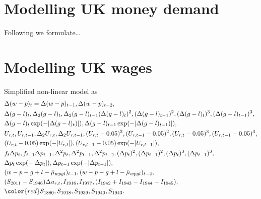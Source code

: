 \section{Modelling UK money demand}
Following \cite{KrolzigHendry-Computer_automation-2001} we formulate\ldots

\section{Modelling UK wages}
Simplified non-linear model as \cite[pp.~120]{Hendry-Introductory-2015}
\begin{align}\nonumber
	&\Delta(w-p)_t = \Delta(w-p)_{t-1}, \Delta(w-p)_{t-2}, \\ \nonumber
	&\Delta(g-l)_t, \Delta_2(g-l)_t, \Delta_2(g-l)_{t-1}
		(\Delta(g-l)_t)^2, (\Delta(g-l)_{t-1})^2, (\Delta(g-l)_t)^3,
		(\Delta(g-l)_{t-1})^3, \\ \nonumber
	&\Delta(g-l)_t\exp(-|\Delta(g-l)_t)|), \Delta(g-l)_{t-1}\exp(-|\Delta(g-l)_{t-1})|), \\ \nonumber
	&U_{r,t}, U_{r,t-1}, \Delta_2U_{r,t}, \Delta_2U_{r,t-1}, (U_{r,t} - 0.05)^2,
		(U_{r,t-1} - 0.05)^2, (U_{r,t} - 0.05)^3, (U_{r,t-1} - 0.05)^3, \\ \nonumber
	&(U_{r,t} - 0.05)\exp(-|U_{r,t}|), (U_{r,t-1} - 0.05)\exp(-|U_{r,t-1}|), \\ \nonumber
	&f_t\Delta p_t, f_{t-1}\Delta p_{t-1}, \Delta^2p_t, \Delta^2p_{t-1}, \Delta^2p_{t-2},
		(\Delta p_t)^2, (\Delta p_{t-1})^2, (\Delta p_t)^3, (\Delta p_{t-1})^3, \\ \nonumber
	&\Delta p_t\exp(-|\Delta p_t|), \Delta p_{t-1}\exp(-|\Delta p_{t-1}|), \\ \nonumber
	&(w - p - g + l - \hat{\mu}_{wpgl})_{t-1}, (w - p - g + l - \hat{\mu}_{wpgl})_{t-2}, \\ \nonumber
	&(S_{2011} - S_{1946})\Delta u_{r,t}, I_{1916}, I_{1977},
		(I_{1942} + I_{1943} - I_{1944} - I_{1945}), \\ \nonumber
	&{\color{red}S_{1880}, S_{1918}, S_{1939}, S_{1940}, S_{1943}}.
\end{align}
